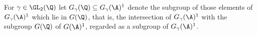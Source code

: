 For $\gamma\in\GL_2(\Q)$ let $G_\gamma(\Q)\subseteq G_\gamma(\A)^1$ denote the subgroup of those elements of $G_\gamma(\A)^1$ which lie
in $G(\Q)$, that is, the intersection of $G_\gamma(\A)^1$ with the subgroup $G(\Q)$ of $G(\A)^1$, regarded as a subgroup of $G_\gamma(\A)^1$.
